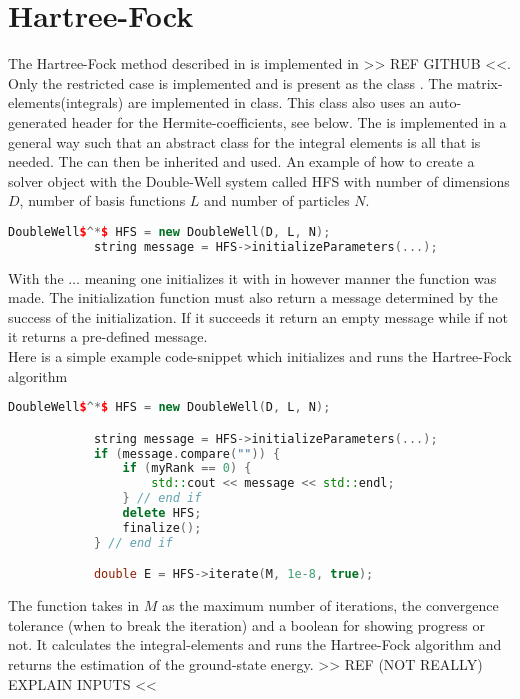 \section{Hartree-Fock}
    The Hartree-Fock method described in  is implemented in
    >> REF GITHUB <<. Only the restricted case is implemented and is present as
    the class . The matrix-elements(integrals) are
    implemented in  class. This class also uses an
    auto-generated header for the Hermite-coefficients, see
     below. The  is
    implemented in a general way such that an abstract class for the integral
    elements is all that is needed. The  can then
    be inherited and used.  An example of how to create a solver object with
    the Double-Well system called HFS with number of dimensions $D$, number of
    basis functions $L$ and number of particles $N$.
        \begin{lstlisting}[language=C++, style=ccstyle]
            DoubleWell$^*$ HFS = new DoubleWell(D, L, N);
            string message = HFS->initializeParameters(...);
        \end{lstlisting}
    With the $\dots$ meaning one initializes it with in however manner the
    function was made. The initialization function must also return a message
    determined by the success of the initialization. If it succeeds it return
    an empty message while if not it returns a pre-defined message. \\ 
    Here is a simple example code-snippet which initializes and runs the
    Hartree-Fock algorithm
        \begin{lstlisting}[language=C++, style=ccstyle]
            DoubleWell$^*$ HFS = new DoubleWell(D, L, N);

            string message = HFS->initializeParameters(...);
            if (message.compare("")) {
                if (myRank == 0) {
                    std::cout << message << std::endl;
                } // end if
                delete HFS;
                finalize();
            } // end if

            double E = HFS->iterate(M, 1e-8, true);
        \end{lstlisting}
    The  function takes in $M$ as the maximum number of
    iterations, the convergence tolerance (when to break the iteration) and a
    boolean for showing progress or not. It calculates the integral-elements
    and runs the Hartree-Fock algorithm and returns the estimation of the
    ground-state energy. >> REF (NOT REALLY) EXPLAIN INPUTS <<

